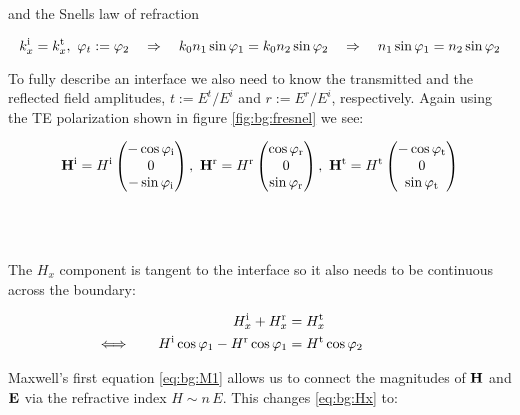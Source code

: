 and the Snells law of refraction

\begin{equation}
    k^{\mathrm{i}}_x = k^{\mathrm{t}}_x, \
    \varphi_t := \varphi_2
    \quad \Rightarrow \quad
    k_0 n_1 \sin \varphi_1 =  k_0 n_2 \sin \varphi_2
    \quad \Rightarrow \quad
    n_1 \sin \varphi_1 = n_2 \sin \varphi_2
\end{equation}

To fully describe an interface we also need to know the transmitted and the reflected field amplitudes,  
$t := E^t / E^i$ 
and 
$r := E^r / E^i$, 
respectively.
Again using the TE polarization shown in figure \ref{fig:bg:fresnel} we see:

\begin{equation} \label{eq:bg:H}
    \vb H^{\mathrm{i}} = H^{\mathrm{i}}
    \begin{pmatrix}
        -\cos \varphi_{\mathrm{i}}\\ 0\\ -\sin \varphi_{\mathrm{i}}
    \end{pmatrix}
    , \
    \vb H^{\mathrm{r}} = H^{\mathrm{r}}
    \begin{pmatrix}
        \cos \varphi_{\mathrm{r}} \\ 0\\ \sin \varphi_{\mathrm{r}}
    \end{pmatrix}
    , \
    \vb H^{\mathrm{t}} = H^{\mathrm{t}}
    \begin{pmatrix}
        -\cos \varphi_{\mathrm{t}}\\ 0\\ \sin \varphi_{\mathrm{t}}
    \end{pmatrix}
\end{equation}
\\
\\
\\

The $H_x$ component is tangent to the interface so it also needs to be continuous across the boundary:

\begin{equation}\label{eq:bg:Hx}
\begin{aligned}
     H^{\mathrm{i}}_x +  H^{\mathrm{r}}_x &=  H^{\mathrm{t}}_x \\
    \Longleftrightarrow \qquad
    H^{\mathrm{i}} \cos \varphi_1 - H^{\mathrm{r}} \cos \varphi_1 &= H^{\mathrm{t}} \cos \varphi_2
    \qquad  \qquad
\end{aligned}
\end{equation}

Maxwell's first equation \eqref{eq:bg:M1} allows us to connect the magnitudes of $\vb H$ and $\vb E$ via the refractive index $H \sim n \, E$. This changes \eqref{eq:bg:Hx} to:

